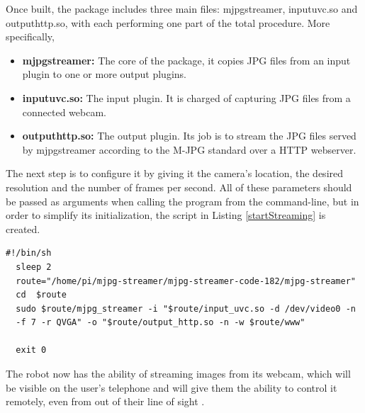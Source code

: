 Once built, the package includes three main files: mjpg\textunderscore streamer, input\textunderscore uvc.so and output\textunderscore http.so, with each performing one part of the total procedure. More specifically,
  
  \begin{itemize}
        
    \item \textbf{mjpg\textunderscore streamer:} The core of the package, it copies JPG files from an input plugin to one or more output plugins.

    \item \textbf{input\textunderscore uvc.so:} The input plugin. It is charged of capturing JPG files from a connected webcam.

    \item \textbf{output\textunderscore http.so:} The output plugin. Its job is to stream the JPG files served by mjpg\textunderscore streamer according to the M-JPG standard over a HTTP webserver.

  \end{itemize}

The next step is to configure it by giving it the camera's location, the desired resolution and the number of frames per second. All of these parameters should be passed as arguments when calling the program from the command-line, but in order to simplify its initialization, the script in Listing \ref{startStreaming} is created.

  \begin{minipage}{\linewidth}%
  \begin{lstlisting}[label=startStreaming,caption=Streaming Initialization Script {[} startStreaming.sh {]}  ]
  #!/bin/sh
  sleep 2
  route="/home/pi/mjpg-streamer/mjpg-streamer-code-182/mjpg-streamer"
  cd  $route
  sudo $route/mjpg_streamer -i "$route/input_uvc.so -d /dev/video0 -n 
  -f 7 -r QVGA" -o "$route/output_http.so -n -w $route/www"

  exit 0

  \end{lstlisting}
  \end{minipage}

\bigskip
The robot now has the ability of streaming images from its webcam, which will be visible on the user's telephone and will give them the ability to control it remotely, even from out of their line of sight .
















